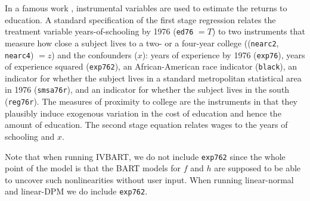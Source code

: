 
In a famous work \citep{Card93}, instrumental variables are used to
estimate the returns to education.  A standard specification of the
first stage regression relates the treatment variable
years-of-schooling by 1976 (\texttt{ed76} $=T$)  to two instruments
that measure how close a subject lives to a two- or a four-year
college ((\texttt{nearc2}, \texttt{nearc4}) $= z$)
and the confounders ($x$): 
years of experience by 1976 (\texttt{exp76}), 
years of experience squared (\texttt{exp762}), 
an African-American race indicator (\texttt{black}), 
an indicator for whether the subject lives in a
standard metropolitan statistical area in 1976 (\texttt{smsa76r}), and
an indicator for whether the subject lives in the south (\texttt{reg76r}).  
The measures of proximity to college are the
instruments in that they plausibly induce exogenous variation in the
cost of education and hence the amount of education.  The second stage
equation relates wages to the years of schooling and $x$.

Note that when running IVBART, we do not include \texttt{exp762} since the whole point of the model
is that the BART models for $f$ and $h$ are supposed to be able to uncover such nonlinearities without user input.
When running linear-normal and linear-DPM we do include \texttt{exp762}.

